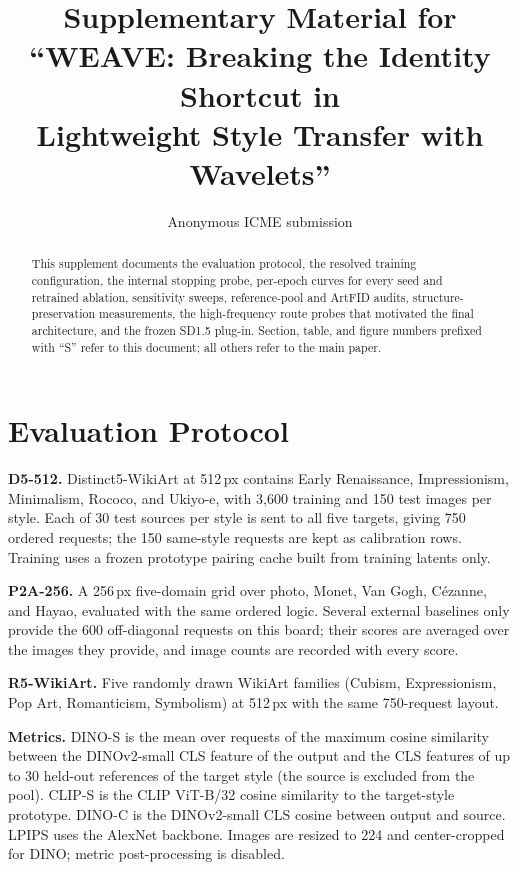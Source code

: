 \documentclass[conference]{IEEEtran}
\newcommand{\dinos}{DINO-S}
\newcommand{\dinoc}{DINO-C}
\newcommand{\clips}{CLIP-S}
\begin{document}
\title{Supplementary Material for\\``WEAVE: Breaking the Identity Shortcut in\\Lightweight Style Transfer with Wavelets''}
\author{Anonymous ICME submission}
\maketitle

\begin{abstract}
This supplement documents the evaluation protocol, the resolved training configuration, the
internal stopping probe, per-epoch curves for every seed and retrained ablation, sensitivity
sweeps, reference-pool and ArtFID audits, structure-preservation measurements, the
high-frequency route probes that motivated the final architecture, and the frozen SD1.5 plug-in.
Section, table, and figure numbers prefixed with ``S'' refer to this document; all others refer
to the main paper.
\end{abstract}

\section{Evaluation Protocol}
\label{sec:protocol}

\noindent\textbf{D5-512.} Distinct5-WikiArt at 512\,px contains Early Renaissance, Impressionism,
Minimalism, Rococo, and Ukiyo-e, with 3{,}600 training and 150 test images per style. Each of 30
test sources per style is sent to all five targets, giving 750 ordered requests; the 150
same-style requests are kept as calibration rows. Training uses a frozen prototype pairing cache
built from training latents only.

\noindent\textbf{P2A-256.} A 256\,px five-domain grid over photo, Monet, Van Gogh, C\'ezanne, and
Hayao, evaluated with the same ordered logic. Several external baselines only provide the 600
off-diagonal requests on this board; their scores are averaged over the images they provide, and
image counts are recorded with every score.

\noindent\textbf{R5-WikiArt.} Five randomly drawn WikiArt families (Cubism, Expressionism, Pop
Art, Romanticism, Symbolism) at 512\,px with the same 750-request layout.

\noindent\textbf{Metrics.} \dinos{} is the mean over requests of the maximum cosine similarity
between the DINOv2-small CLS feature of the output and the CLS features of up to 30 held-out
references of the target style (the source is excluded from the pool). \clips{} is the CLIP
ViT-B/32 cosine similarity to the target-style prototype. \dinoc{} is the DINOv2-small CLS cosine
between output and source. LPIPS uses the AlexNet backbone. Images are resized to 224 and
center-cropped for DINO; metric post-processing is disabled.
\end{document}
